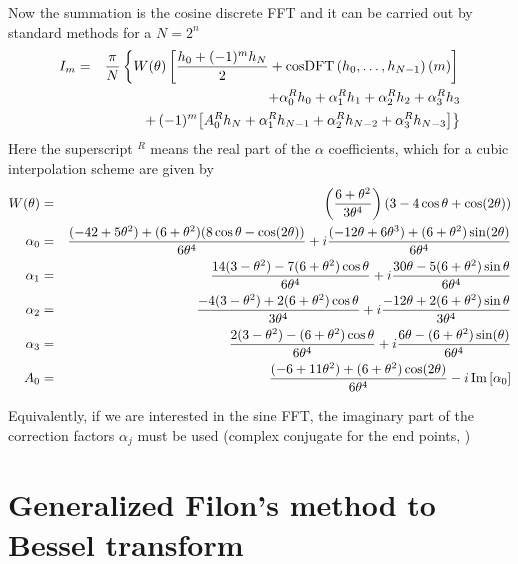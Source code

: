 Now the summation is the cosine discrete FFT \cite[(12.3.17)]{Press1966_NRIvI} and it can
be carried out by standard methods for a $N=2^{n}$
\begin{eqnarray}\label{Q:NMI2}
  I_{m} &=& \frac{\pi}{N} \left\{ W(\theta) \left[ \frac{h_{0} + (-1)^{m}
        h_{N}}{2} + \mathrm{cosDFT} \left(h_{0}, \ldots, h_{N-1} \right)(m)
    \right] \right.
  \\
  && + \alpha^{R}_{0} h_{0} + \alpha^{R}_{1}h_{1} + \alpha^{R}_{2} h_{2}
  + \alpha^{R}_{3} h_{3} \nonumber
  \\
  && \left. + \, (-1)^{m} \big[ A^{R}_{0} h_{N} + \alpha^{R}_{1} h_{N-1}
    + \alpha^{R}_{2} h_{N-2} + \alpha^{R}_{3} h_{N-3} \big] \nonumber
    \vstretch \right\}
\end{eqnarray}
Here the superscript $^{R}$ means the real part of the $\alpha$ coefficients, which for a
cubic interpolation scheme are given by
\begin{eqnarray*}
  W(\theta) &=& \left( \frac{6+\theta^{2}}{3 \theta^{4}}\right)(3 -4
  \cos\theta + \cos(2 \theta))
  \\
  \alpha_{0} &=& \frac{(-42 + 5 \theta^{2})+ (6+\theta^{2})(8 \cos \theta
    - \cos (2 \theta))}{6 \theta^{4}} + i \frac{(-12 \theta + 6
    \theta^{3}) +(6 + \theta^{2}) \sin (2 \theta)}{6 \theta^{4}}
  \\
  \alpha_{1} &=& \frac{14(3 - \theta^{2}) - 7 (6 + \theta^{2})\cos
    \theta}{6 \theta^{4}} + i \frac{30 \theta - 5(6+\theta^{2}) \sin
    \theta}{6 \theta^{4}}
  \\
  \alpha_{2} &=& \frac{-4(3-\theta^{2}) + 2(6+\theta^{2}) \cos \theta}{ 3
    \theta^{4}} + i \frac{-12 \theta + 2 (6+\theta^{2}) \sin \theta}{3
    \theta^{4}} \\
  \alpha_{3} &=& \frac{2(3 - \theta^{2}) - (6+\theta^{2}) \cos \theta }{6
    \theta^{4}} + i\frac{6 \theta - (6+ \theta^{2}) \sin(\theta)}{6
    \theta^{4}}
  \\
  A_{0} &=& \frac{(-6 + 11\theta^{2})+(6+\theta^{2})\cos(2 \theta)}{6
    \theta^{4}} - i \, \mathrm{Im}\left[ \alpha_{0} \right]
\end{eqnarray*}

Equivalently, if we are interested in the sine FFT, the imaginary part of the correction
factors $\alpha_{j}$ must be used (complex conjugate for the end points,
\cite[see][]{Press1966_NRIvI})

\section{Generalized Filon's method to Bessel transform}


